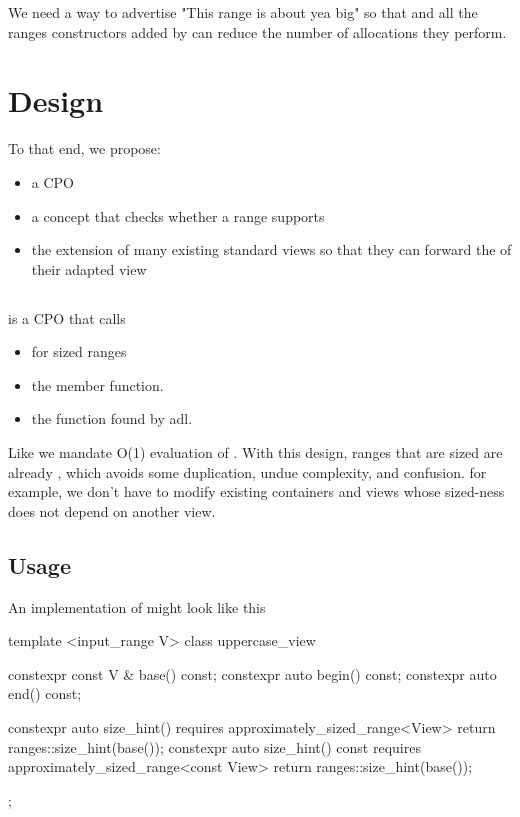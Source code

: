 \documentclass{wg21}
\begin{document}
We need a way to advertise "This range is about yea big" so that  and all the ranges constructors added by 
can reduce the number of allocations they perform.

\section{Design}

To that end, we propose:

\begin{itemize}
\item a  CPO
\item a  concept that checks whether a range supports 
\item the extension of many existing standard views so that they can forward the  of their adapted view
\end{itemize}

\subsection{}

 is a CPO that calls
\begin{itemize}
    \item {} for sized ranges
    \item the  member function.
    \item the  function found by adl.
\end{itemize}

Like  we mandate O(1) evaluation of .
With this design, ranges that are sized are already , which avoids some duplication, undue complexity, and confusion.
for example, we don't have to modify existing containers and views whose sized-ness does not depend on another view.

\subsection{Usage}

An implementation of  might look like this

\begin{colorblock}
template <input_range V>
class uppercase_view {
    constexpr const V & base() const;
    constexpr auto begin() const;
    constexpr auto end() const;

    constexpr auto size_hint() requires approximately_sized_range<View> {
        return ranges::size_hint(base());
    }
    constexpr auto size_hint() const requires approximately_sized_range<const View> {
        return ranges::size_hint(base());
    }
};
\end{colorblock}
\end{document}
